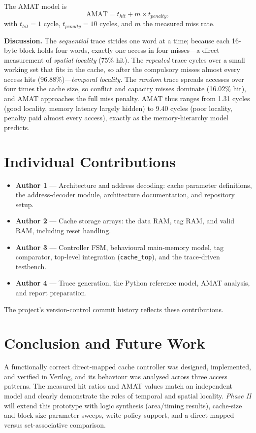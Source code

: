 \documentclass[conference]{IEEEtran}
\begin{document}
The AMAT model is
\begin{equation}
\text{AMAT} = t_{hit} + m \times t_{penalty},
\end{equation}
with $t_{hit}=1$ cycle, $t_{penalty}=10$ cycles, and $m$ the measured miss rate.

\textbf{Discussion.} The \emph{sequential} trace strides one word at a time;
because each 16-byte block holds four words, exactly one access in four
misses---a direct measurement of \emph{spatial locality} (75\% hit). The
\emph{repeated} trace cycles over a small working set that fits in the cache, so
after the compulsory misses almost every access hits (96.88\%)---\emph{temporal
locality}. The \emph{random} trace spreads accesses over four times the cache
size, so conflict and capacity misses dominate (16.02\% hit), and AMAT
approaches the full miss penalty. AMAT thus ranges from 1.31 cycles (good
locality, memory latency largely hidden) to 9.40 cycles (poor locality, penalty
paid almost every access), exactly as the memory-hierarchy model predicts.

\section{Individual Contributions}
\begin{itemize}
  \item \textbf{Author 1} --- Architecture and address decoding: cache parameter
        definitions, the address-decoder module, architecture documentation, and
        repository setup.
  \item \textbf{Author 2} --- Cache storage arrays: the data RAM, tag RAM, and
        valid RAM, including reset handling.
  \item \textbf{Author 3} --- Controller FSM, behavioural main-memory model, tag
        comparator, top-level integration (\texttt{cache\_top}), and the
        trace-driven testbench.
  \item \textbf{Author 4} --- Trace generation, the Python reference model, AMAT
        analysis, and report preparation.
\end{itemize}
The project's version-control commit history reflects these contributions.

\section{Conclusion and Future Work}
A functionally correct direct-mapped cache controller was designed, implemented,
and verified in Verilog, and its behaviour was analysed across three access
patterns. The measured hit ratios and AMAT values match an independent model and
clearly demonstrate the roles of temporal and spatial locality. \emph{Phase II}
will extend this prototype with logic synthesis (area/timing results),
cache-size and block-size parameter sweeps, write-policy support, and a
direct-mapped versus set-associative comparison.
\end{document}
